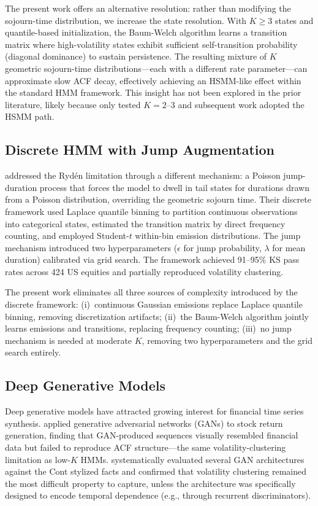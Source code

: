 The present work offers an alternative resolution: rather than modifying the sojourn-time distribution, we increase the state resolution.
With $K \geq 3$ states and quantile-based initialization, the Baum-Welch algorithm learns a transition matrix where high-volatility states exhibit sufficient self-transition probability (diagonal dominance) to sustain persistence.
The resulting mixture of $K$ geometric sojourn-time distributions---each with a different rate parameter---can approximate slow ACF decay, effectively achieving an HSMM-like effect within the standard HMM framework.
This insight has not been explored in the prior literature, likely because \citet{ryden1998stylized} only tested $K = 2$--$3$ and subsequent work adopted the HSMM path.

\subsection{Discrete HMM with Jump Augmentation}

\citet{alswaidan2026hybrid} addressed the Ryd\'{e}n limitation through a different mechanism: a Poisson jump-duration process that forces the model to dwell in tail states for durations drawn from a Poisson distribution, overriding the geometric sojourn time.
Their discrete framework used Laplace quantile binning to partition continuous observations into categorical states, estimated the transition matrix by direct frequency counting, and employed Student-$t$ within-bin emission distributions.
The jump mechanism introduced two hyperparameters ($\epsilon$ for jump probability, $\lambda$ for mean duration) calibrated via grid search.
The framework achieved 91--95\% KS pass rates across 424 US equities and partially reproduced volatility clustering.

The present work eliminates all three sources of complexity introduced by the discrete framework:
(i)~continuous Gaussian emissions replace Laplace quantile binning, removing discretization artifacts;
(ii)~the Baum-Welch algorithm jointly learns emissions and transitions, replacing frequency counting;
(iii)~no jump mechanism is needed at moderate $K$, removing two hyperparameters and the grid search entirely.

\subsection{Deep Generative Models}

Deep generative models have attracted growing interest for financial time series synthesis.
\citet{takahashi2019modeling} applied generative adversarial networks (GANs) to stock return generation, finding that GAN-produced sequences visually resembled financial data but failed to reproduce ACF structure---the same volatility-clustering limitation as low-$K$ HMMs.
\citet{kwon2024can} systematically evaluated several GAN architectures against the Cont stylized facts and confirmed that volatility clustering remained the most difficult property to capture, unless the architecture was specifically designed to encode temporal dependence (e.g., through recurrent discriminators).

